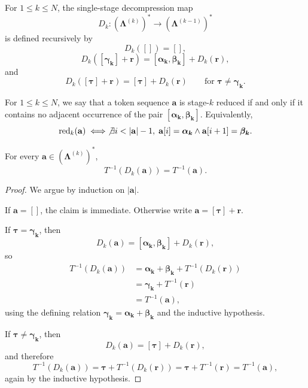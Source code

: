 \begin{definition}
    For $1 \leq k \leq N$, the single-stage decompression map
    \[
    D_k : (\boldsymbol{\Lambda}^{(k)})^* \to (\boldsymbol{\Lambda}^{(k-1)})^*
    \]
    is defined recursively by
    \[
    D_k([]) = [],
    \]
    \[
    D_k([\boldsymbol{\gamma_k}] + \mathbf{r})
    =
    [\boldsymbol{\alpha_k}, \boldsymbol{\beta_k}] + D_k(\mathbf{r}),
    \]
    and
    \[
    D_k([\boldsymbol{\tau}] + \mathbf{r})
    =
    [\boldsymbol{\tau}] + D_k(\mathbf{r})
    \qquad
    \text{for } \boldsymbol{\tau} \neq \boldsymbol{\gamma_k}.
    \]
\end{definition}

\begin{definition}
    For $1 \leq k \leq N$, we say that a token sequence $\mathbf{a}$ is stage-$k$ reduced if and only if
    it contains no adjacent occurrence of the pair $[\boldsymbol{\alpha_k}, \boldsymbol{\beta_k}]$.
    Equivalently,
    \[
    \operatorname{red}_k(\mathbf{a})
    \iff
    \not\exists i < |\mathbf{a}|-1,\;
    \mathbf{a}[i] = \boldsymbol{\alpha_k}
    \land
    \mathbf{a}[i+1] = \boldsymbol{\beta_k}.
    \]
\end{definition}

\begin{lemma}
    \label{lemma:bpe-decompression-preserves-literalization}
    For every $\mathbf{a} \in (\boldsymbol{\Lambda}^{(k)})^*$,
    \[
    T^{-1}(D_k(\mathbf{a})) = T^{-1}(\mathbf{a}).
    \]
\end{lemma}
\begin{proof}
    We argue by induction on $|\mathbf{a}|$.

    If $\mathbf{a} = []$, the claim is immediate.
    Otherwise write $\mathbf{a} = [\boldsymbol{\tau}] + \mathbf{r}$.

    If $\boldsymbol{\tau} = \boldsymbol{\gamma_k}$, then
    \[
    D_k(\mathbf{a}) = [\boldsymbol{\alpha_k}, \boldsymbol{\beta_k}] + D_k(\mathbf{r}),
    \]
    so
    \begin{align*}
    T^{-1}(D_k(\mathbf{a}))
    &=
    \boldsymbol{\alpha_k} + \boldsymbol{\beta_k} + T^{-1}(D_k(\mathbf{r})) \\
    &=
    \boldsymbol{\gamma_k} + T^{-1}(\mathbf{r}) \\
    &=
    T^{-1}(\mathbf{a}),
    \end{align*}
    using the defining relation $\boldsymbol{\gamma_k} = \boldsymbol{\alpha_k}+\boldsymbol{\beta_k}$
    and the inductive hypothesis.

    If $\boldsymbol{\tau} \neq \boldsymbol{\gamma_k}$, then
    \[
    D_k(\mathbf{a}) = [\boldsymbol{\tau}] + D_k(\mathbf{r}),
    \]
    and therefore
    \[
    T^{-1}(D_k(\mathbf{a}))
    =
    \boldsymbol{\tau} + T^{-1}(D_k(\mathbf{r}))
    =
    \boldsymbol{\tau} + T^{-1}(\mathbf{r})
    =
    T^{-1}(\mathbf{a}),
    \]
    again by the inductive hypothesis.
\end{proof}

